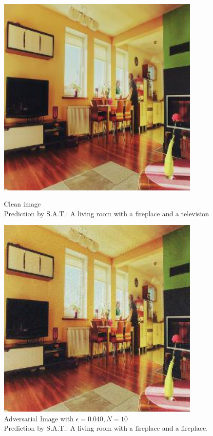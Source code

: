 \begin{figure}[ht]
    \centering
    \begin{minipage}{0.45\textwidth}
        \centering
        \includegraphics[width=0.9\textwidth]{figures/ShowDistractAndDeceive/n=10/samples/0.000/img_0.jpg} %
        \caption*{Clean image\\Prediction by S.A.T.: A living room with a fireplace and a television}
    \end{minipage}\hfill
    \begin{minipage}{0.45\textwidth}
        \centering
        \includegraphics[width=0.9\textwidth]{figures/ShowDistractAndDeceive/n=10/samples/0.040/img_0.jpg} %
        \caption*{Adversarial Image with $\epsilon=0.040, N=10$\\Prediction by S.A.T.: A living room with a fireplace and a fireplace.}
    \end{minipage}
\end{figure}

